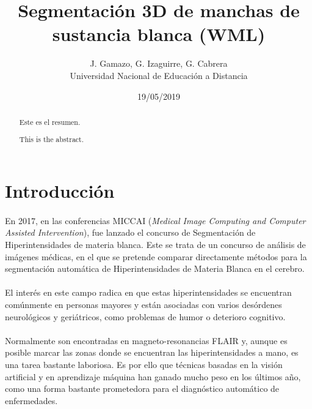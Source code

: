 \documentclass[12pt]{article}
\title{Segmentación 3D de manchas de sustancia blanca (WML)}
\date{19/05/2019}
\author{J. Gamazo, G. Izaguirre, G. Cabrera \\
	 Universidad Nacional de Educación a Distancia}
\begin{document}
	\maketitle
	\newpage
	\paragraph{}
	\newpage
	\tableofcontents
	\newpage
	
	\renewcommand{\abstractname}{Resumen}

	\begin{abstract}
	Este es el resumen.
	\end{abstract}
	
	
	\renewcommand{\abstractname}{\textit{Abstract}}
	
	\begin{abstract}
	This is the abstract.
	\end{abstract}

	\newpage
	
	\section{Introducción}

	\paragraph{}
	En 2017, en las conferencias MICCAI (\textit{Medical Image Computing and Computer Assisted Intervention}), fue lanzado el concurso de Segmentación de Hiperintensidades de materia blanca. Este se trata de un concurso de análisis de imágenes médicas, en el que se pretende comparar directamente métodos para la segmentación automática de Hiperintensidades de Materia Blanca en el cerebro.

	\paragraph{}
	El interés en este campo radica en que estas hiperintensidades se encuentran comúnmente en personas mayores y están asociadas con varios desórdenes neurológicos y geriátricos, como problemas de humor o deterioro cognitivo.

	\paragraph{}
	Normalmente son encontradas en magneto-resonancias FLAIR y, aunque es posible marcar las zonas donde se encuentran las hiperintensidades a mano, es una tarea bastante laboriosa. Es por ello que técnicas basadas en la visión artificial y en aprendizaje máquina han ganado mucho peso en los últimos año, como una forma bastante prometedora para el diagnóstico automático de enfermedades.
\end{document}
